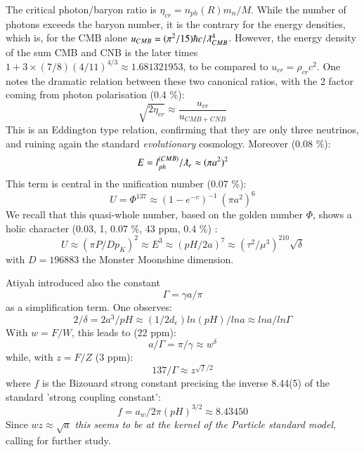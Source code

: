 \documentclass[twoside,draft]{article}
\begin{document}
\begin{sloppypar}
The critical photon/baryon ratio is $ \eta_{cr} = n_{ph}(R) m_n/M$. While the number of photons exceeds the baryon number, it is the contrary for the energy densities, which is, for the CMB alone $u_{CMB} = (\pi^2/15)\hbar c /\lambdabar_{CMB}^4$. However, the energy density of the sum CMB and CNB is the later times $1 + 3 \times (7/8) (4/11)^{4/3} \approx 1.681321953$, to be compared to $u_{cr} = \rho_{cr} c^2$. One notes the dramatic relation between these two canonical ratios, with the 2 factor coming from photon polarisation (0.4 \%): 
\begin{equation}
\sqrt{2\eta_{cr}} \approx \frac{u_{cr}}{u_{CMB + CNB}} 
\end{equation}
This is an Eddington type relation, confirming that they are only three neutrinos, and ruining again the standard \textit{evolutionary} cosmology.
Moreover (0.08 \%):
\begin{equation}
E = l_{ph}^{(CMB)}/\lambdabar_e \approx (\pi a^2)^2
\end{equation}
This term is central in the unification number \cite{Sanchez4} (0.07 \%):
\begin{equation}
U = \Phi^{137} \approx (1-e^{-v})^{-1}~ (\pi a^2)^6 
\end{equation}
We recall that this quasi-whole number, based on the golden number $\Phi$, shows a holic character\cite{Sanchez4} (0.03, 1, 0.07 \%, 43 ppm, 0.4 \%)  :
\begin{equation}
U  \approx (\pi P/Dp_K)^2 \approx E^3 \approx (pH/2a)^7 \approx (\tau^2/\mu^3)^{210} \sqrt{\delta}
\end{equation}
with $D = 196883$ the Monster Moonshine dimension\cite{Conway}.
    
Atiyah introduced also the constant 
\begin{equation}
 \Gamma = \gamma a /\pi
\end{equation}    
as a simplification term. One observes: 
\begin{equation}
2/\delta = 2a^3/pH \approx (1/2d_{e}) ln(pH)/lna \approx lna/ln\Gamma
\end{equation}
With  $w = F/W$, this leads to (22 ppm):
\begin{equation}
a/\Gamma = \pi /\gamma  \approx w^{\delta}
\end{equation}
while, with $z = F/Z$ (3 ppm):
\begin{equation}
 137/\Gamma \approx z^{\sqrt{f}/2}   
\end{equation}
where $f$ is the Bizouard strong constant precising the inverse 8.44(5) of the standard 'strong coupling constant'\cite{Tanabashi}:
\begin{equation}
f = a_w/2\pi (pH)^{3/2} \approx 8.43450
\end{equation}
Since $wz\approx \sqrt{a}$ \textit{this seems to be at the kernel of the Particle standard model}, calling for further study. 


\end{sloppypar}
\end{document}
